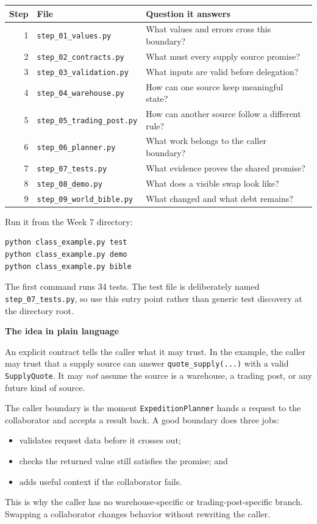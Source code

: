 \documentclass[11pt]{article}
\newcommand{\code}[1]{\texttt{#1}}
\newcommand{\heading}[1]{\vspace{0.6em}\noindent\colorbox{softblue}{\parbox{\dimexpr\linewidth-2\fboxsep}{\large\bfseries\color{navy}#1}}\vspace{0.25em}}
\begin{document}
\begin{center}
\begin{tabular}{@{}r l p{3.45in}@{}}
\toprule
\textbf{Step} & \textbf{File} & \textbf{Question it answers}\\
\midrule
1 & \code{step\_01\_values.py} & What values and errors cross this boundary?\\
2 & \code{step\_02\_contracts.py} & What must every supply source promise?\\
3 & \code{step\_03\_validation.py} & What inputs are valid before delegation?\\
4 & \code{step\_04\_warehouse.py} & How can one source keep meaningful state?\\
5 & \code{step\_05\_trading\_post.py} & How can another source follow a different rule?\\
6 & \code{step\_06\_planner.py} & What work belongs to the caller boundary?\\
7 & \code{step\_07\_tests.py} & What evidence proves the shared promise?\\
8 & \code{step\_08\_demo.py} & What does a visible swap look like?\\
9 & \code{step\_09\_world\_bible.py} & What changed and what debt remains?\\
\bottomrule
\end{tabular}
\end{center}

\noindent Run it from the Week 7 directory:
\begin{verbatim}
python class_example.py test
python class_example.py demo
python class_example.py bible
\end{verbatim}
The first command runs 34 tests. The test file is deliberately named
\code{step\_07\_tests.py}, so use this entry point rather than generic test
discovery at the directory root.

\heading{The idea in plain language}
An explicit contract tells the caller what it may trust. In the example, the
caller may trust that a supply source can answer \code{quote\_supply(...)} with
a valid \code{SupplyQuote}. It may \emph{not} assume the source is a warehouse,
a trading post, or any future kind of source.

The caller boundary is the moment \code{ExpeditionPlanner} hands a request to
the collaborator and accepts a result back. A good boundary does three jobs:
\begin{itemize}
  \item validates request data before it crosses out;
  \item checks the returned value still satisfies the promise; and
  \item adds useful context if the collaborator fails.
\end{itemize}
This is why the caller has no warehouse-specific or trading-post-specific
branch. Swapping a collaborator changes behavior without rewriting the caller.
\end{document}
